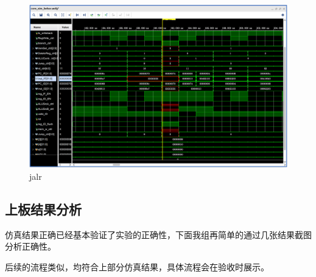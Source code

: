 \begin{figure}[H]
    \centering
    \includegraphics[width=1.0\textwidth]{figs/8.png}
    \caption{jalr}
    \label{Fig.11}
\end{figure}

\subsection{上板结果分析}
仿真结果正确已经基本验证了实验的正确性，下面我组再简单的通过几张结果截图分析正确性。


后续的流程类似，均符合上部分仿真结果，具体流程会在验收时展示。